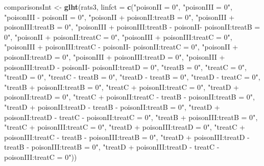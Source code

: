 \documentclass[
  12pt,dutch]{book}
\newenvironment{Shaded}{\begin{snugshade}}{\end{snugshade}}
\newcommand{\AttributeTok}[1]{\textcolor[rgb]{0.13,0.29,0.53}{#1}}
\newcommand{\FunctionTok}[1]{\textcolor[rgb]{0.13,0.29,0.53}{\textbf{#1}}}
\newcommand{\NormalTok}[1]{#1}
\newcommand{\OtherTok}[1]{\textcolor[rgb]{0.56,0.35,0.01}{#1}}
\newcommand{\StringTok}[1]{\textcolor[rgb]{0.31,0.60,0.02}{#1}}
\theoremstyle{definition}
\theoremstyle{definition}
\theoremstyle{definition}
\theoremstyle{definition}
\theoremstyle{remark}
\begin{document}
\begin{Shaded}
\begin{Highlighting}[]
\NormalTok{comparisonsInt }\OtherTok{\textless{}{-}} \FunctionTok{glht}\NormalTok{(rats3, }\AttributeTok{linfct =} \FunctionTok{c}\NormalTok{(}\StringTok{"poisonII = 0"}\NormalTok{,}
    \StringTok{"poisonIII = 0"}\NormalTok{, }\StringTok{"poisonIII {-} poisonII = 0"}\NormalTok{, }\StringTok{"poisonII + poisonII:treatB = 0"}\NormalTok{,}
    \StringTok{"poisonIII + poisonIII:treatB = 0"}\NormalTok{, }\StringTok{"poisonIII + poisonIII:treatB {-} poisonII{-} poisonII:treatB = 0"}\NormalTok{,}
    \StringTok{"poisonII + poisonII:treatC = 0"}\NormalTok{, }\StringTok{"poisonIII + poisonIII:treatC = 0"}\NormalTok{,}
    \StringTok{"poisonIII + poisonIII:treatC {-} poisonII{-} poisonII:treatC = 0"}\NormalTok{,}
    \StringTok{"poisonII + poisonII:treatD = 0"}\NormalTok{, }\StringTok{"poisonIII + poisonIII:treatD = 0"}\NormalTok{,}
    \StringTok{"poisonIII + poisonIII:treatD {-} poisonII{-} poisonII:treatD = 0"}\NormalTok{,}
    \StringTok{"treatB = 0"}\NormalTok{, }\StringTok{"treatC = 0"}\NormalTok{, }\StringTok{"treatD = 0"}\NormalTok{, }\StringTok{"treatC {-} treatB = 0"}\NormalTok{,}
    \StringTok{"treatD {-} treatB = 0"}\NormalTok{, }\StringTok{"treatD {-} treatC = 0"}\NormalTok{, }\StringTok{"treatB + poisonII:treatB = 0"}\NormalTok{,}
    \StringTok{"treatC + poisonII:treatC = 0"}\NormalTok{, }\StringTok{"treatD + poisonII:treatD = 0"}\NormalTok{,}
    \StringTok{"treatC + poisonII:treatC {-} treatB {-} poisonII:treatB = 0"}\NormalTok{,}
    \StringTok{"treatD + poisonII:treatD {-} treatB {-} poisonII:treatB = 0"}\NormalTok{,}
    \StringTok{"treatD + poisonII:treatD {-} treatC {-} poisonII:treatC = 0"}\NormalTok{,}
    \StringTok{"treatB + poisonIII:treatB = 0"}\NormalTok{, }\StringTok{"treatC + poisonIII:treatC = 0"}\NormalTok{,}
    \StringTok{"treatD + poisonIII:treatD = 0"}\NormalTok{, }\StringTok{"treatC + poisonIII:treatC {-} treatB {-} poisonIII:treatB = 0"}\NormalTok{,}
    \StringTok{"treatD + poisonIII:treatD {-} treatB {-} poisonIII:treatB = 0"}\NormalTok{,}
    \StringTok{"treatD + poisonIII:treatD {-} treatC {-} poisonIII:treatC = 0"}\NormalTok{))}


\end{Highlighting}
\end{Shaded}
\end{document}
